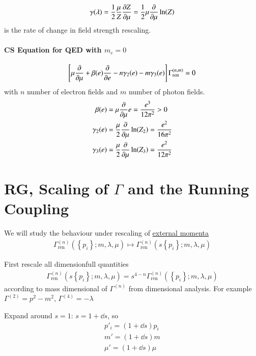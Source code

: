\begin{align}
   \gamma(\lambda) = \frac{1}{2} \frac{\mu}{Z} \pdv{Z}{\mu} = \frac{1}{2} \mu \pdv{\mu} \ln(Z)
\end{align}
is the rate of change in field strength rescaling.

\paragraph{CS Equation for QED with $m_e = 0$}
\begin{align*}
   \left[\mu \pdv{\mu} + \beta(e) \pdv{e} - n\gamma_2(e) - m\gamma_3(e) \right] \Gamma_\text{ren}^{(n,m)} = 0
\end{align*}
with $n$ number of electron fields and $m$ number of photon fields. 
\begin{align*}
   \beta (e) &= \mu \pdv{\mu} e = \frac{e^3}{12\pi^2} > 0 \\
   \gamma_2 (e) &= \frac{\mu}{2} \pdv{\mu} \ln(Z_2) = \frac{e^2}{16\pi^2} \\
   \gamma_3(e) &= \frac{\mu}{2} \pdv{\mu} \ln(Z_3) = \frac{e^2}{12\pi^2}
\end{align*}

\section{RG, Scaling of $\Gamma$ and the Running Coupling}
We will study the behaviour under rescaling of \underline{external momenta}
\begin{align}
   \Gamma_\text{ren}^{(n)} \left( \left\{ p_i \right\}; m, \lambda, \mu \right) \mapsto  \Gamma_\text{ren}^{(n)} \left( s \left\{ p_i \right\}; m, \lambda, \mu \right)
\end{align}

First rescale all dimensionfull quantities
\begin{align}
   \Gamma_\text{ren}^{(n)} \left( s\left\{ p_i \right\}; m, \lambda, \mu \right) = s^{4-n} \Gamma_\text{ren}^{(n)} \left( \left\{ p_i \right\}; m, \lambda, \mu \right)
\end{align}
according to mass dimensional of $\Gamma^{(n)}$ from dimensional analysis. For example $\Gamma^{(2)} = p^2 - m^2$, $\Gamma^{(4)} = - \lambda$

Expand around $s=1$: $s = 1+\dd{s}$, so 
\begin{align*}
   p'_i = (1+\dd{s}) p_i \\
   m' = (1+\dd{s})m \\
   \mu' = (1+\dd{s})\mu
\end{align*}

